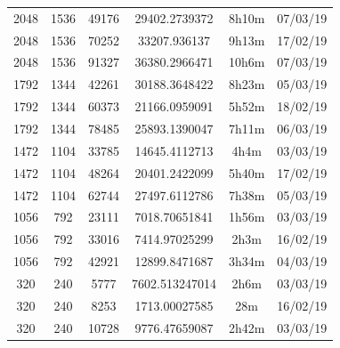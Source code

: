 \documentclass[11pt,a4paper]{report}
\begin{document}
\begin{itemize}
\begin{center}
\begin{tabular}{ c c c | c c c }
  2048 & 1536 & 49176 & 29402.2739372 & 8h10m & 07/03/19 \\
  2048 & 1536 & 70252 & 33207.936137 & 9h13m & 17/02/19 \\
  2048 & 1536 & 91327 & 36380.2966471 & 10h6m & 07/03/19 \\
  1792 & 1344 & 42261 & 30188.3648422 & 8h23m & 05/03/19 \\
  1792 & 1344 & 60373 & 21166.0959091 & 5h52m & 18/02/19 \\
  1792 & 1344 & 78485 & 25893.1390047 & 7h11m & 06/03/19 \\
  1472 & 1104 & 33785 & 14645.4112713 & 4h4m & 03/03/19 \\
  1472 & 1104 & 48264 & 20401.2422099 & 5h40m & 17/02/19 \\
  1472 & 1104 & 62744 & 27497.6112786 & 7h38m & 05/03/19 \\
  1056 & 792 & 23111 & 7018.70651841 & 1h56m & 03/03/19 \\
  1056 & 792 & 33016 & 7414.97025299 & 2h3m & 16/02/19 \\
  1056 & 792 & 42921 & 12899.8471687 & 3h34m & 04/03/19 \\
  320 & 240 & 5777 & 7602.513247014 & 2h6m & 03/03/19 \\
  320 & 240 & 8253 & 1713.00027585 & 28m & 16/02/19 \\
  320 & 240 & 10728 & 9776.47659087 & 2h42m & 03/03/19 \\
  \end{tabular}
  \end{center}


\end{itemize}
\end{document}
